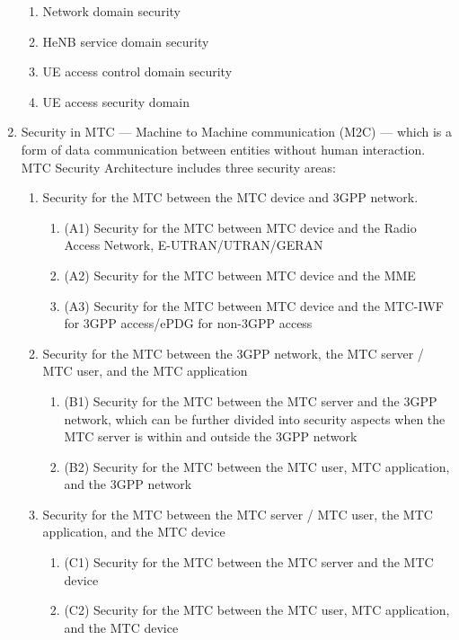 \documentclass[a4paper]{report}
\begin{document}
\begin{enumerate}
\begin{enumerate}
    \item Network domain security
    \item HeNB service domain security
    \item UE access control domain security
    \item UE access security domain
    \end{enumerate}
\item Security in MTC --- Machine to Machine communication (M2C) --- which is a form of data communication between entities without 
         human interaction. MTC Security Architecture includes three security areas:
    \begin{enumerate}
    \item Security for the MTC between the MTC device and 3GPP network.
        \begin{enumerate}
        \item (A1) Security for the MTC between MTC device and the Radio Access Network, E-UTRAN/UTRAN/GERAN
        \item (A2) Security for the MTC between MTC device and the MME
        \item (A3) Security for the MTC between MTC device and the MTC-IWF for 3GPP access/ePDG for non-3GPP access
        \end{enumerate}
    \item Security for the MTC between the 3GPP network, the MTC server / MTC user, and the MTC application
        \begin{enumerate}
        \item (B1) Security for the MTC between the MTC server and the 3GPP network, which can be further divided into security aspects 
                 when the MTC server is within and outside the 3GPP network
        \item (B2) Security for the MTC between the MTC user, MTC application, and the 3GPP network
        \end{enumerate}
    \item Security for the MTC between the MTC server / MTC user, the MTC application, and the MTC device
        \begin{enumerate}
        \item (C1) Security for the MTC between the MTC server and the MTC device
        \item (C2) Security for the MTC between the MTC user, MTC application, and the MTC device
        \end{enumerate}
    \end{enumerate}
\end{enumerate}
\end{document}
